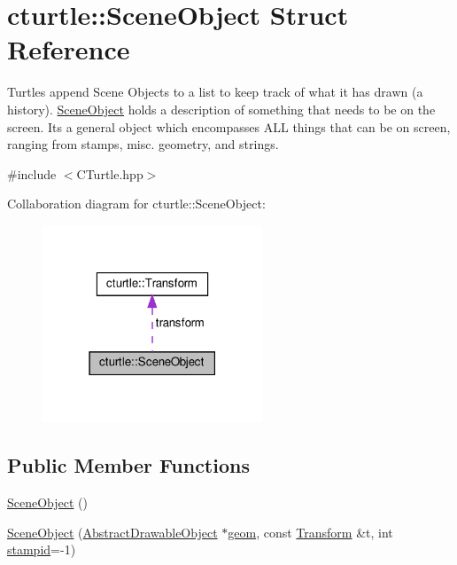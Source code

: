 \hypertarget{structcturtle_1_1SceneObject}{}\section{cturtle\+:\+:Scene\+Object Struct Reference}
\label{structcturtle_1_1SceneObject}


Turtles append Scene Objects to a list to keep track of what it has drawn (a history). \hyperlink{structcturtle_1_1SceneObject}{Scene\+Object} holds a description of something that needs to be on the screen. It\textquotesingle{}s a general object which encompasses A\+LL things that can be on screen, ranging from stamps, misc. geometry, and strings.  




{\ttfamily \#include $<$C\+Turtle.\+hpp$>$}



Collaboration diagram for cturtle\+:\+:Scene\+Object\+:\nopagebreak
\begin{figure}[H]
\begin{center}
\leavevmode
\includegraphics[width=186pt]{structcturtle_1_1SceneObject__coll__graph}
\end{center}
\end{figure}
\subsection*{Public Member Functions}
\begin{DoxyCompactItemize}
\item 
\hyperlink{structcturtle_1_1SceneObject_ac51b04f4e0509e37a7acce739e608e49}{Scene\+Object} ()
\item 
\hyperlink{structcturtle_1_1SceneObject_a278686eef9384bed5d891065a3a02619}{Scene\+Object} (\hyperlink{classcturtle_1_1AbstractDrawableObject}{Abstract\+Drawable\+Object} $\ast$\hyperlink{structcturtle_1_1SceneObject_a1db44363183fd197b232d5f6e4b89b5c}{geom}, const \hyperlink{classcturtle_1_1Transform}{Transform} \&t, int \hyperlink{structcturtle_1_1SceneObject_ae6094918613e5d4d284805cd5afb2e65}{stampid}=-\/1)
\end{DoxyCompactItemize}
